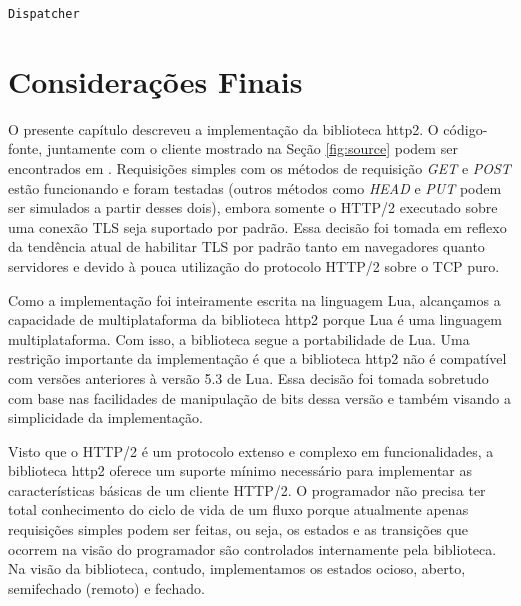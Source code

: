 \begin{center}
 \begin{minipage}{0.7\textwidth}
  \begin{codigo}[H]
   \small
   \caption{\texttt{Dispatcher}}
   \label{code:dispatcher}
  \end{codigo}
 \end{minipage}
\end{center}

\section{Considerações Finais}
\label{sec:implfinals}

O presente capítulo descreveu a implementação da biblioteca http2. O código-fonte, juntamente com o cliente mostrado na Seção \ref{fig:source} podem ser encontrados em \cite{Paulahttp2}. Requisições simples com os métodos de requisição {\em GET} e {\em POST} estão funcionando e foram testadas (outros métodos como {\em HEAD} e {\em PUT} podem ser simulados a partir desses dois), embora somente o HTTP/2 executado sobre uma conexão TLS seja suportado por padrão. Essa decisão foi tomada em reflexo da tendência atual de habilitar TLS por padrão tanto em navegadores quanto servidores e devido à pouca utilização do protocolo HTTP/2 sobre o TCP puro.

Como a implementação foi inteiramente escrita na linguagem Lua, alcançamos a capacidade de multiplataforma da biblioteca http2 porque Lua é uma linguagem multiplataforma. Com isso, a biblioteca segue a portabilidade de Lua. Uma restrição importante da implementação é que a biblioteca http2 não é compatível com versões anteriores à versão 5.3 de Lua. Essa decisão foi tomada sobretudo com base nas facilidades de manipulação de bits dessa versão e também visando a simplicidade da implementação.

Visto que o HTTP/2 é um protocolo extenso e complexo em funcionalidades, a biblioteca http2 oferece um suporte mínimo necessário para implementar as características básicas de um cliente HTTP/2. O programador não precisa ter total conhecimento do ciclo de vida de um fluxo porque atualmente apenas requisições simples podem ser feitas, ou seja, os estados e as transições que ocorrem na visão do programador são controlados internamente pela biblioteca. Na visão da biblioteca, contudo, implementamos os estados ocioso, aberto, semifechado (remoto) e fechado.

